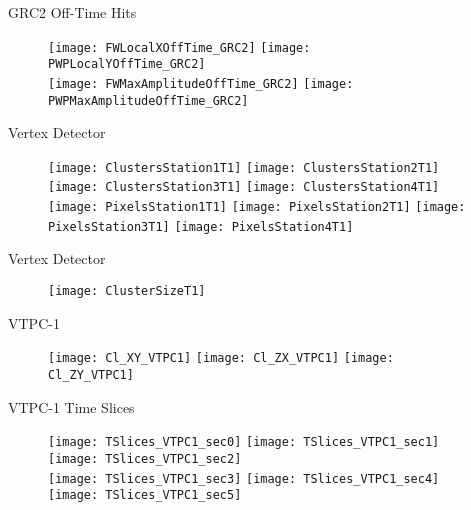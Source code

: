 \documentclass[11pt]{beamer}
\begin{document}
\begin{frame}{GRC2 Off-Time Hits}
\begin{figure}
\centering
\texttt{[image: FWLocalXOffTime\_GRC2]}
\texttt{[image: PWPLocalYOffTime\_GRC2]} \\
\texttt{[image: FWMaxAmplitudeOffTime\_GRC2]}
\texttt{[image: PWPMaxAmplitudeOffTime\_GRC2]} 
\end{figure}
\end{frame}

\begin{frame}{Vertex Detector}
\begin{figure}
\centering
\texttt{[image: ClustersStation1T1]}
\texttt{[image: ClustersStation2T1]}
\texttt{[image: ClustersStation3T1]}
\texttt{[image: ClustersStation4T1]} \\
\texttt{[image: PixelsStation1T1]}
\texttt{[image: PixelsStation2T1]}
\texttt{[image: PixelsStation3T1]}
\texttt{[image: PixelsStation4T1]} \\
\end{figure}
\end{frame}
\begin{frame}{Vertex Detector}
\begin{figure}
\centering
\texttt{[image: ClusterSizeT1]}
\end{figure}
\end{frame}

\begin{frame}{VTPC-1}
\begin{figure}
\centering
\texttt{[image: Cl\_XY\_VTPC1]}
\texttt{[image: Cl\_ZX\_VTPC1]}
\texttt{[image: Cl\_ZY\_VTPC1]}
\end{figure}
\end{frame}

\begin{frame}{VTPC-1 Time Slices}
\begin{figure}
\centering
\texttt{[image: TSlices\_VTPC1\_sec0]}
\texttt{[image: TSlices\_VTPC1\_sec1]}
\texttt{[image: TSlices\_VTPC1\_sec2]}\\
\texttt{[image: TSlices\_VTPC1\_sec3]}
\texttt{[image: TSlices\_VTPC1\_sec4]}
\texttt{[image: TSlices\_VTPC1\_sec5]}
\end{figure}
\end{frame}
\end{document}
